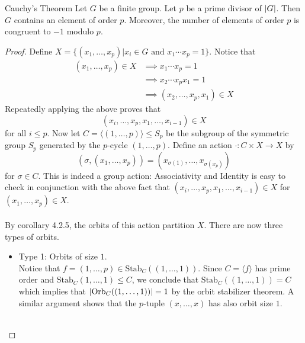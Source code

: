 \documentclass[a4paper]{article}
\begin{document}
\begin{thm}{Cauchy's Theorem}{} Let $G$ be a finite group. Let $p$ be a prime divisor of $\abs{G}$. Then $G$ contains an element of order $p$. Moreover, the number of elements of order $p$ is congruent to $-1$ modulo $p$. \tcbline
\begin{proof}
Define $X=\{(x_1,\dots,x_p)|x_i\in G\text{ and }x_1\cdots x_p=1\}$. Notice that 
\begin{align*}
(x_1,\dots,x_p)\in X&\implies x_1\cdots x_p=1\\
&\implies x_2\cdots x_px_1=1\\
&\implies(x_2,\dots,x_p,x_1)\in X
\end{align*}
Repeatedly applying the above proves that $$(x_i,\dots,x_p,x_1,\dots,x_{i-1})\in X$$ for all $i\leq p$. Now let $C=\langle(1,\dots,p)\rangle\leq S_p$ be the subgroup of the symmetric group $S_p$ generated by the $p$-cycle $(1,\dots,p)$. Define an action $\cdot:C\times X\to X$ by $$(\sigma,(x_1,\dots,x_p))=(x_{\sigma(1)},\dots,x_{\sigma(x_p)})$$ for $\sigma\in C$. This is indeed a group action: Associativity and Identity is easy to check in conjunction with the above fact that $(x_i,\dots,x_p,x_1,\dots,x_{i-1})\in X$ for $(x_1,\dots,x_p)\in X$. \\~\\

By corollary 4.2.5, the orbits of this action partition $X$. There are now three types of orbits. 
\begin{itemize}
\item Type 1: Orbits of size $1$. \\
Notice that $f=(1,\dots,p)\in\text{Stab}_C((1,\dots,1))$. Since $C=\langle f\rangle$ has prime order and $\text{Stab}_C(1,\dots,1)\leq C$, we conclude that $\text{Stab}_C((1,\dots,1))=C$ which implies that $\abs{\text{Orb}_C((1,\dots,1))}=1$ by the orbit stabilizer theorem. A similar argument shows that the $p$-tuple $(x,\dots,x)$ has also orbit size $1$. \\~\\


\end{itemize}
\end{proof}
\end{thm}
\end{document}
